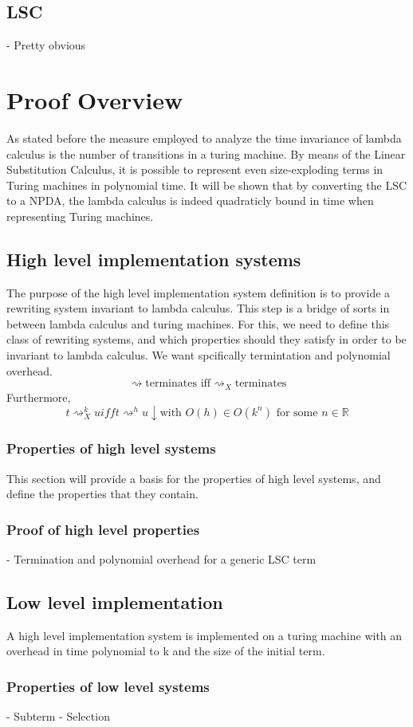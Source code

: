 \documentclass[12pt]{article}
\begin{document}
\subsection{LSC}
- Pretty obvious
\section{Proof Overview}
As stated before the measure employed to analyze the time invariance of lambda calculus is the number of transitions in a turing machine. By means of the Linear Substitution Calculus, it is possible to represent even size-exploding terms in Turing machines in polynomial time. It will be shown that by converting the LSC to a NPDA, the lambda calculus is indeed quadraticly bound in time when representing Turing machines.
\subsection{High level implementation systems}
The purpose of the high level implementation system definition is to provide a rewriting system invariant to lambda calculus. This step is a bridge of sorts in between lambda calculus and turing machines. For this, we need to define this class of rewriting systems, and which properties should they satisfy in order to be invariant to lambda calculus. We want spcifically termintation and polynomial overhead.
$$\rightsquigarrow \text{terminates iff} {\rightsquigarrow}_{X} \text{terminates}$$
Furthermore,
$$t {\rightsquigarrow}_{X}^k u iff t {\rightsquigarrow}^h u\downarrow \text{with } O(h) \in O(k^n) \text{ for some } n \in \mathbb{R} $$
\subsubsection{Properties of high level systems}
This section will provide a basis for the properties of high level systems, and define the properties that they contain.
\subsubsection{Proof of high level properties}
- Termination and polynomial overhead for a generic LSC term
\subsection{Low level implementation}
A high level implementation system is implemented on a turing machine with an overhead in time polynomial to k and the size of the initial term.
\subsubsection{Properties of low level systems}
- Subterm
- Selection
\end{document}
